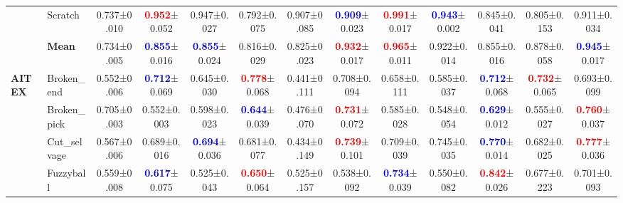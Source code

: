 \documentclass[10pt,twocolumn,letterpaper]{article}
\begin{document}
\begin{table*}[bt]
{\begin{tabular}{l@{}l@{}|c||ccccc||ccccc}
          & Scratch & 0.737\footnotesize{±0.010}& \textcolor{red}{\textbf{0.952}}\footnotesize{±0.052}& 0.947\footnotesize{±0.027}& 0.792\footnotesize{±0.075}& 0.907\footnotesize{±0.085}& \textcolor{blue}{\textbf{0.909}}\footnotesize{±0.023}& \textcolor{red}{\textbf{0.991}}\footnotesize{±0.017}& \textcolor{blue}{\textbf{0.943}}\footnotesize{±0.002}& 0.845\footnotesize{±0.041}& 0.805\footnotesize{±0.153}& 0.911\footnotesize{±0.034} \\
          \cline{2-13}
          & \textbf{Mean} & 0.734\footnotesize{±0.005}& \textcolor{blue}{\textbf{0.855}}\footnotesize{±0.016}& \textcolor{blue}{\textbf{0.855}}\footnotesize{±0.024}& 0.816\footnotesize{±0.029}& 0.825\footnotesize{±0.023}& \textcolor{red}{\textbf{0.932}}\footnotesize{±0.017}& \textcolor{red}{\textbf{0.965}}\footnotesize{±0.011}& 0.922\footnotesize{±0.014}& 0.855\footnotesize{±0.016}& 0.878\footnotesize{±0.058}& \textcolor{blue}{\textbf{0.945}}\footnotesize{±0.017}  \\
    \hline
    \multirow{7}[0]{*}{\textbf{AITEX}} & Broken\_end & 0.552\footnotesize{±0.006}& \textcolor{blue}{\textbf{0.712}}\footnotesize{±0.069}& 0.645\footnotesize{±0.030}& \textcolor{red}{\textbf{0.778}}\footnotesize{±0.068}& 0.441\footnotesize{±0.111}& 0.708\footnotesize{±0.094}& 0.658\footnotesize{±0.111}& 0.585\footnotesize{±0.037}& \textcolor{blue}{\textbf{0.712}}\footnotesize{±0.068}& \textcolor{red}{\textbf{0.732}}\footnotesize{±0.065}& 0.693\footnotesize{±0.099} \\
          & Broken\_pick & 0.705\footnotesize{±0.003}& 0.552\footnotesize{±0.003}& 0.598\footnotesize{±0.023}& \textcolor{blue}{\textbf{0.644}}\footnotesize{±0.039}& 0.476\footnotesize{±0.070}& \textcolor{red}{\textbf{0.731}}\footnotesize{±0.072}& 0.585\footnotesize{±0.028}& 0.548\footnotesize{±0.054}& \textcolor{blue}{\textbf{0.629}}\footnotesize{±0.012}& 0.555\footnotesize{±0.027}& \textcolor{red}{\textbf{0.760}}\footnotesize{±0.037} \\
          & Cut\_selvage & 0.567\footnotesize{±0.006}& 0.689\footnotesize{±0.016}& \textcolor{blue}{\textbf{0.694}}\footnotesize{±0.036}& 0.681\footnotesize{±0.077}& 0.434\footnotesize{±0.149}& \textcolor{red}{\textbf{0.739}}\footnotesize{±0.101}& 0.709\footnotesize{±0.039}& 0.745\footnotesize{±0.035}& \textcolor{blue}{\textbf{0.770}}\footnotesize{±0.014}& 0.682\footnotesize{±0.025}& \textcolor{red}{\textbf{0.777}}\footnotesize{±0.036} \\
          & Fuzzyball & 0.559\footnotesize{±0.008}& \textcolor{blue}{\textbf{0.617}}\footnotesize{±0.075}& 0.525\footnotesize{±0.043}& \textcolor{red}{\textbf{0.650}}\footnotesize{±0.064}& 0.525\footnotesize{±0.157}& 0.538\footnotesize{±0.092}& \textcolor{blue}{\textbf{0.734}}\footnotesize{±0.039}& 0.550\footnotesize{±0.082}& \textcolor{red}{\textbf{0.842}}\footnotesize{±0.026}& 0.677\footnotesize{±0.223}& 0.701\footnotesize{±0.093}\\

\end{tabular}}
\end{table*}
\end{document}
